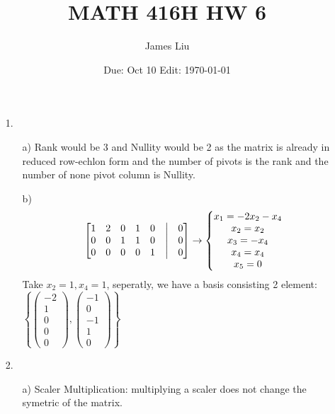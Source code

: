 \documentclass{article}
\date{Due: Oct 10 Edit: \today}
\title{MATH 416H HW 6}
\author{James Liu}
\begin{document}
\maketitle
\begin{itemize}
    \item [1.]
    \begin{itemize}
        \item [a)]
        Rank would be 3 and Nullity would be 2 as the matrix is already in reduced row-echlon form and the number of pivots is the rank and the number of none pivot column is Nullity.
        \item [b)]
        \begin{align*}
            \begin{bmatrix}
                1&2&0&1&0&\bigm|&0\\
                0&0&1&1&0&\bigm|&0\\
                0&0&0&0&1&\bigm|&0
            \end{bmatrix}
            \rightarrow
            \left\{\begin{matrix}
                x_1 = -2x_2-x_4\\
                x_2 = x_2\\
                x_3 = -x_4\\
                x_4 = x_4\\
                x_5 = 0
            \end{matrix}\right.
        \end{align*}
        Take \(x_2=1,x_4=1\), seperatly, we have a basis consisting 2 element: \(\displaystyle \left\{\begin{pmatrix}
        -2\\1\\0\\0\\0
        \end{pmatrix},\begin{pmatrix}
            -1\\0\\-1\\1\\0
        \end{pmatrix}\right\}\)
    \end{itemize}
    \item [2.]
    \begin{itemize}
        \item [a)]Scaler Multiplication: multiplying a scaler does not change the symetric of the matrix.\\

\end{itemize}
\end{itemize}
\end{document}
